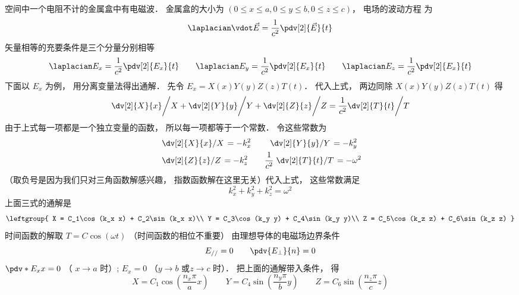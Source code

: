 
空间中一个电阻不计的金属盒中有电磁波． 金属盒的大小为 $(0 \le x \le a, 0 \le y \le b, 0 \le z \le c)$， 电场的波动方程%
为
\begin{equation}
\laplacian \vdot \vec E = \frac{1}{c^2} \pdv[2]{\vec E}{t}
\end{equation}  
矢量相等的充要条件是三个分量分别相等
\begin{equation}
\laplacian E_x = \frac{1}{c^2} \pdv[2]{E_x}{t} \qquad
\laplacian E_y = \frac{1}{c^2} \pdv[2]{E_x}{t} \qquad
\laplacian E_z = \frac{1}{c^2} \pdv[2]{E_x}{t}
\end{equation}   
下面以 $E_x$ 为例， 用分离变量法得出通解．
先令 $E_x = X(x) Y(y) Z(z) T(t)$． 代入上式， 两边同除 $X(x) Y(y) Z(z) T(t)$ 得
\begin{equation}
\left. \dv[2]{X}{x} \middle/ X + \dv[2]{Y}{y} \middle/ Y + \dv[2]{Z}{z} \middle/ Z  = \frac{1}{c^2}  \dv[2]{T}{t} \middle/ T\right.
\end{equation}
由于上式每一项都是一个独立变量的函数， 所以每一项都等于一个常数． 令这些常数为
\begin{equation}\begin{aligned}
&\left. \dv[2]{X}{x} \middle/ X \right. = -k_x^2 \qquad
\left. \dv[2]{Y}{y} \middle/ Y \right. = -k_y^2\\
&\left. \dv[2]{Z}{z} \middle/ Z \right. = -k_z^2 \qquad
\frac{1}{c^2} \left. \dv[2]{T}{t} \middle/ T \right. = -\omega^2
\end{aligned}\end{equation}
（取负号是因为我们只对三角函数解感兴趣， 指数函数解在这里无关）代入上式， 这些常数满足
\begin{equation}
k_x^2 + k_y^2 + k_z^2 = \omega ^2
\end{equation} 
上面三式的通解是
\begin{equation}
\leftgroup{
X = C_1\cos(k_x x) + C_2\sin(k_x x)\\
Y = C_3\cos(k_y y) + C_4\sin(k_y y)\\
Z = C_5\cos(k_z z) + C_6\sin(k_z z)
}\end{equation} 
时间函数的解取 $T = C\cos(\omega t)$ （时间函数的相位不重要）
由理想导体的电磁场边界条件%
\begin{equation}
E_{//} = 0  \qquad  \pdv{E_\bot}{n} = 0
\end{equation}  
$\pdv*{E_x}{x} = 0$ （ $x \to a$ 时）;  $E_x = 0$ （$y \to b$ 或$z \to c$ 时）． 把上面的通解带入条件， 得
\begin{equation}
X = C_1\cos(\frac{n_x \pi}{a} x)
\qquad
Y = C_4\sin(\frac{n_y \pi}{b} y)
\qquad
Z = C_6\sin(\frac{n_z \pi}{c} z)
\end{equation}  
